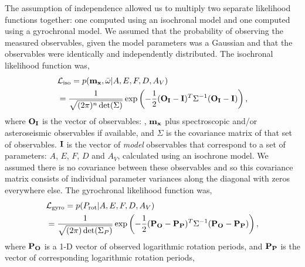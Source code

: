 The assumption of independence allowed us to multiply two separate likelihood
functions together: one computed using an isochronal model and one computed
using a gyrochronal model.
We assumed that the probability of observing the measured observables, given
the model parameters was a Gaussian and that the observables were identically
and independently distributed.
The isochronal likelihood function was,
\begin{eqnarray} \label{eqn:isochrones_only_likelihood}
    & \mathcal{L_{\mathrm{iso}}} = p({\bf m_x},
    \bar{\omega}|A, E, F, D,
    A_V) \\ \nonumber
    & = \frac{1}{\sqrt{(2\pi)^n \det(\Sigma)}}
    \exp\left( -\frac{1}{2} ({\bf O_I} - {\bf I})^T \Sigma ^{-1}
    ({\bf O_I} - {\bf I})\right),
\end{eqnarray}
where ${\bf O_I}$ is the vector of observables: \pmega, ${\bf m_x}$ plus
spectroscopic and/or asteroseismic observables if available, and $\Sigma$ is
the covariance matrix of that set of observables.
${\bf I}$ is the vector of {\it model} observables that correspond to a set of
parameters: $A$, $E$, $F$, $D$ and $A_V$, calculated using an isochrone model.
We assumed there is no covariance between these observables and so this
covariance matrix consists of individual parameter variances along the
diagonal with zeros everywhere else.
The gyrochronal likelihood function was,
\begin{eqnarray} \label{eqn:gyro_likelihood}
    & \mathcal{L_{\mathrm{gyro}}} = p(P_\mathrm{rot} |A, E, F, D, A_V) \\ \nonumber
    & = \frac{1}{\sqrt{(2\pi) \det(\Sigma_P)}}
    \exp\left( -\frac{1}{2} ({\bf P_O} - {\bf P_P})^T \Sigma ^{-1}
    ({\bf P_O} - {\bf P_P})\right),
\end{eqnarray}
where ${\bf P_O}$ is a 1-D vector of observed logarithmic rotation periods,
and ${\bf P_P}$ is the vector of corresponding logarithmic rotation periods,
